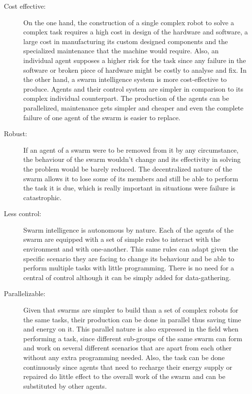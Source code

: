 \begin{description}
\item[Cost effective:] On the one hand, the construction of a single complex robot to solve a complex task requires a high cost in design of the hardware and software, a large cost in manufacturing its custom designed components and the specialized maintenance that the machine would require. Also, an individual agent supposes a higher risk for the task since any failure in the software or broken piece of hardware might be costly to analyse and fix. In the other hand, a swarm intelligence system is more cost-effective to produce.  Agents and their control system are simpler in comparison to its complex individual counterpart. The production of the agents can be parallelized, maintenance gets simpler and cheaper and even the complete failure of one agent of the swarm is easier to replace.

\item[Robust:] If an agent of a swarm were to be removed from it by any circumstance, the behaviour of the swarm wouldn't change and its effectivity in solving the problem would be barely reduced. The decentralized nature of the swarm allows it to lose some of its members and still be able to perform the task it is due, which is really important in situations were failure is catastrophic.

\item[Less control:] Swarm intelligence is autonomous by nature. Each of the agents of the swarm are equipped with a set of simple rules to interact with the environment and with one-another. This same rules can adapt given the specific scenario they are facing to change its behaviour and be able to perform multiple tasks with little programming. There is no need for a central of control although it can be simply added for data-gathering.

\item[Parallelizable:] Given that swarms are simpler to build than a set of complex robots for the same tasks, their production can be done in parallel thus saving time and energy on it. This parallel nature is also expressed in the field when performing a task, since different sub-groups of the same swarm can form and work on several different scenarios that are apart from each other without any extra programming needed. Also, the task can be done continuously since agents that need to recharge their energy supply or repaired do little effect to the overall work of the swarm and can be substituted by other agents.
\end{description}


